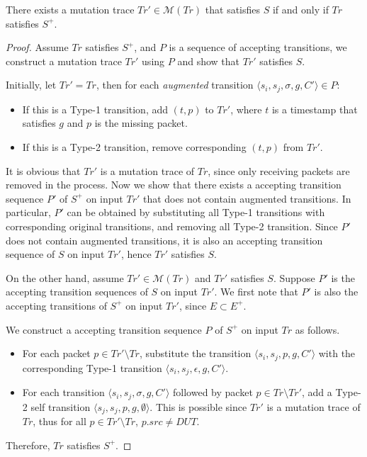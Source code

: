\begin{theorem}
  There exists a mutation trace $Tr' \in \mathcal{M}(Tr)$ that satisfies $S$ if
  and only if $Tr$ satisfies $S^+$.
 \label{lem:equivalent}
\end{theorem}
\begin{proof}
  Assume $Tr$ satisfies $S^+$, and $P$ is a sequence of accepting transitions,
  we construct a mutation trace $Tr'$ using $P$ and show that $Tr'$ satisfies
  $S$.

  Initially, let $Tr'=Tr$, then for each \textit{augmented} transition $\langle s_i,
  s_j, \sigma, g, C'\rangle \in P$:
  \begin{itemize}
    \item If this is a Type-1 transition, add $(t, p)$ to $Tr'$, where $t$ is a
      timestamp that satisfies $g$ and $p$ is the missing packet.
    \item If this is a Type-2 transition, remove corresponding $(t, p)$ from
      $Tr'$.
  \end{itemize}
  It is obvious that $Tr'$ is a mutation trace of $Tr$, since only receiving
  packets are removed in the process.
  Now we show that there exists a accepting
  transition sequence $P'$ of $S^+$ on input $Tr'$ that does not contain
  augmented transitions.
  In particular, $P'$ can be obtained by substituting all
  Type-1 transitions with corresponding original transitions, and removing all
  Type-2 transition.
  Since $P'$ does not contain augmented transitions, it is also an accepting
  transition sequence of $S$ on input $Tr'$, hence $Tr'$ satisfies $S$.

  On the other hand, assume $Tr' \in \mathcal{M}(Tr)$ and $Tr'$ satisfies $S$.
  Suppose $P'$ is the accepting transition sequences of $S$ on input $Tr'$.
  We first note that $P'$ is also the accepting transitions of $S^+$ on input
  $Tr'$, since $E \subset E^+$.

  We construct a accepting transition sequence $P$ of $S^+$ on input $Tr$ as
  follows.
  \begin{itemize}
    \item For each packet $p \in Tr' \setminus Tr$, substitute the transition
      $\langle s_i, s_j, p, g, C'\rangle$ with the corresponding Type-1
      transition $\langle s_i, s_j, \epsilon, g, C'\rangle$.
    \item For each transition $\langle s_i, s_j, \sigma, g, C'\rangle$
      followed by packet $p \in Tr\setminus Tr'$, add a Type-2 self
      transition $\langle s_j, s_j, p, g, \emptyset\rangle$. This is
      possible since $Tr'$ is a mutation trace of $Tr$, thus  for all $p \in Tr'
      \setminus Tr$, $p.src \ne DUT$.
  \end{itemize}
  Therefore, $Tr$ satisfies $S^+$.
\end{proof}

